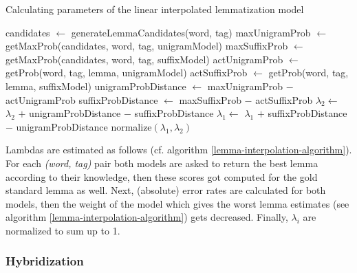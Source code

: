 \begin{algorithm*}
\caption{Calculating parameters of the linear interpolated lemmatization model}\label{lemma-interpolation-algorithm}
\begin{algorithmic}[1]
        \State candidates $\gets$ generateLemmaCandidates(word, tag)
        \State maxUnigramProb $\gets$ getMaxProb(candidates, word, tag, unigramModel)
        \State maxSuffixProb $\gets$ getMaxProb(candidates, word, tag, suffixModel)
        \State actUnigramProb $\gets$ getProb(word, tag, lemma, unigramModel)
        \State actSuffixProb $\gets$ getProb(word, tag, lemma, suffixModel)
        \State unigramProbDistance $\gets$ maxUnigramProb $-$ actUnigramProb
        \State suffixProbDistance $\gets$ maxSuffixProb $-$ actSuffixProb
            \State $\lambda_{2} \gets$ $\lambda_{2}$ $+$ unigramProbDistance $-$ suffixProbDistance
        \Else%
            \State $\lambda_{1} \gets$ $\lambda_{1}$ $+$ suffixProbDistance $-$ unigramProbDistance
        \EndIf
        \State normalize$( \lambda_{1}, \lambda_{2} )$
    \EndFor
  \end{algorithmic}
\end{algorithm*}

Lambdas are estimated as follows (cf. algorithm \ref{lemma-interpolation-algorithm}).
For each \emph{(word, tag)} pair both models are asked to return the best lemma according to their knowledge, then these scores got computed for the gold standard lemma as well.
Next, (absolute) error rates are calculated for both models, then the weight of the model which gives the worst lemma estimates (see algorithm \ref{lemma-interpolation-algorithm}) gets decreased.
Finally, $\lambda_i$  are normalized to sum up to 1.

\subsubsection{Hybridization}

